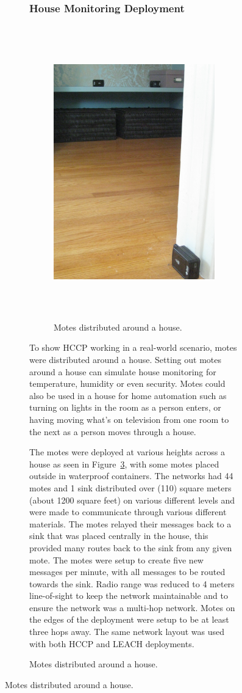 \begin{figure}
\begin{figure}
\subsubsection{House Monitoring Deployment}
\begin{figure}[htb]
    \centering
        \includegraphics[height=5in]{images/deployment/hallway.JPG}
    \caption{Motes distributed around a house.}
    \label{fig:images_deployment_hallway}
\end{figure}

To show HCCP working in a real-world scenario, motes were distributed around a house.
Setting out motes around a house can simulate house monitoring for temperature, humidity
or even security. Motes could also be used in a house for home automation such as 
turning on lights in the room as a person enters, or having moving what's on television
from one room to the next as a person moves through a house.


The motes were deployed at various heights across a house as seen in Figure~\ref{fig:images_deployment_hallway}, with some motes placed outside
in waterproof containers. 
The networks had 44 motes and 1 sink distributed over (110) square meters (about 1200 square feet)
on various different levels and were made to communicate through various different materials.
The motes relayed their messages back to a sink that was placed centrally
in the house, this provided many routes back to the sink from any given mote. The motes were setup to create five new messages per minute, 
with all messages to be routed 
towards the sink.
Radio range was reduced to 4 meters line-of-sight to keep the network maintainable
and to ensure the network was a multi-hop network. Motes on the edges of the deployment were
setup to be at least three hops away.
The same network layout was used 
with both HCCP and LEACH deployments.



\end{figure}
\end{figure}

